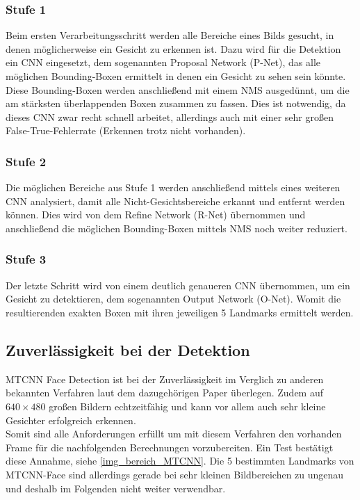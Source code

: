 \subsubsection{Stufe 1}
Beim ersten Verarbeitungsschritt werden alle Bereiche eines Bilds gesucht, in denen möglicherweise ein Gesicht zu erkennen ist. Dazu wird für die Detektion ein CNN eingesetzt, dem sogenannten Proposal Network (P-Net), das alle möglichen Bounding-Boxen ermittelt in denen ein Gesicht zu sehen sein könnte. Diese Bounding-Boxen werden anschließend mit einem NMS ausgedünnt, um die am stärksten überlappenden Boxen zusammen zu fassen. Dies ist notwendig, da dieses CNN zwar recht schnell arbeitet, allerdings auch mit einer sehr großen False-True-Fehlerrate (Erkennen trotz nicht vorhanden).
\subsubsection{Stufe 2}
Die möglichen Bereiche aus Stufe 1 werden anschließend mittels eines weiteren CNN analysiert, damit alle Nicht-Gesichtsbereiche erkannt und entfernt werden können. Dies wird von dem Refine Network (R-Net) übernommen und anschließend die möglichen Bounding-Boxen mittels NMS noch weiter reduziert.
\subsubsection{Stufe 3}
Der letzte Schritt wird von einem deutlich genaueren CNN übernommen, um ein Gesicht zu detektieren, dem sogenannten Output Network (O-Net). Womit die resultierenden exakten Boxen mit ihren jeweiligen 5 Landmarks ermittelt werden.
\subsection{Zuverlässigkeit bei der Detektion}
MTCNN Face Detection ist bei der Zuverlässigkeit im Verglich zu anderen bekannten Verfahren laut dem dazugehörigen Paper \cite{MTCCN} überlegen. Zudem auf $640\times 480$ großen Bildern echtzeitfähig und kann vor allem auch sehr kleine Gesichter erfolgreich erkennen.\\
Somit sind alle Anforderungen erfüllt um mit diesem Verfahren den vorhanden Frame für die nachfolgenden Berechnungen vorzubereiten. Ein Test bestätigt diese Annahme, siehe \autoref{img_bereich_MTCNN}.
Die 5 bestimmten Landmarks von MTCNN-Face sind allerdings gerade bei sehr kleinen Bildbereichen zu ungenau und deshalb im Folgenden nicht weiter verwendbar.
